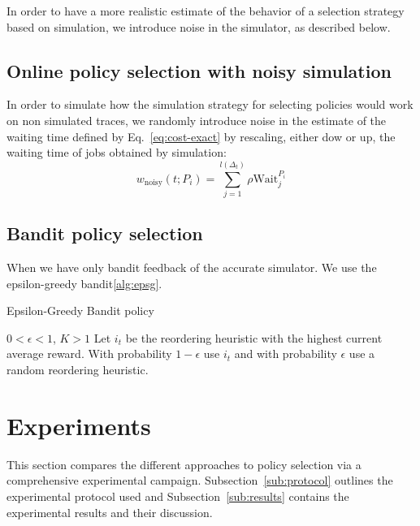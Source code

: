 \documentclass[sigconf]{acmart}
\begin{document}
In order to have a more realistic estimate of the behavior of a selection strategy based on simulation, we introduce noise in the simulator, as described below.

\subsection{Online policy selection with noisy simulation}
\label{sub:noisy}

In order to simulate how the simulation strategy for selecting policies would work on non simulated traces, we randomly introduce noise in the estimate of the waiting time defined by Eq.~\ref{eq:cost-exact} by rescaling, either dow or up, the waiting time of jobs obtained by simulation:
%
\begin{equation}
\label{eq:cost-exact}
w_{\mbox{noisy}}(t;P_i) = \sum_{j=1}^{l(\Delta_t)} \rho \mbox{Wait}_j^{P_i}
\end{equation}
%

\subsection{Bandit policy selection}
\label{sub:bandit}
When we have only bandit feedback of the accurate simulator.
We use the epsilon-greedy bandit\ref{alg:epsg}.

\begin{algorithm}[h]
  \caption{Epsilon-Greedy Bandit policy}
  \begin{algorithmic}[1]
    \renewcommand{\algorithmicrequire}{\textbf{Input:}}
    \renewcommand{\algorithmicensure}{\textbf{Output:}}
    \REQUIRE $0 < \epsilon < 1$, $K>1$
    \STATE Let $i_t$ be the reordering heuristic with the highest current
    average reward.
    \STATE With probability $1-\epsilon$ use $i_t$ and with probability
    $\epsilon$ use a random reordering heuristic.
    \ENDFOR
  \end{algorithmic}
  \label{alg:epsg}
\end{algorithm}



\section{Experiments}
\label{sec:experiments}

This section compares the different approaches to policy selection via a
comprehensive experimental campaign.  Subsection~\ref{sub:protocol} outlines
the experimental protocol used and Subsection~\ref{sub:results} contains the
experimental results and their discussion.
\end{document}
